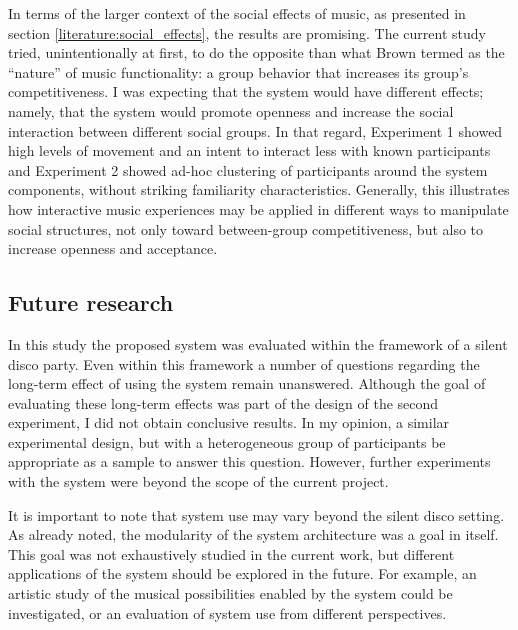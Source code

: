 \documentclass[a4paper,11pt]{article}
\begin{document}
{In terms of the larger context of the social effects of music, as presented in section \ref{literature:social_effects}, the results are promising.
The current study tried, unintentionally at first, to do the opposite than what Brown termed as the ``nature'' of music functionality: a group behavior that increases its group's competitiveness.
I was expecting that the system would have different effects; namely, that the system would promote openness and increase the social interaction between different social groups.
In that regard, Experiment 1 showed high levels of movement and an intent to interact less with known participants and Experiment 2 showed ad-hoc clustering of participants around the system components, without striking familiarity characteristics.
Generally, this illustrates how interactive music experiences may be applied in different ways to manipulate social structures, not only toward between-group competitiveness, but also to increase openness and acceptance.

\subsection{Future research}

In this study the proposed system was evaluated within the framework of a silent disco party.
Even within this framework a number of questions regarding the long-term effect of using the system remain unanswered.
Although the goal of evaluating these long-term effects was part of the design of the second experiment, I did not obtain conclusive results.
In my opinion, a similar experimental design, but with a heterogeneous group of participants be appropriate as a sample to answer this question.
However, further experiments with the system were beyond the scope of the current project.

It is important to note that system use may vary beyond the silent disco setting.
As already noted, the modularity of the system architecture was a goal in itself.
This goal was not exhaustively studied in the current work, but different applications of the system should be explored in the future.
For example, an artistic study of the musical possibilities enabled by the system could be investigated, or an evaluation of system use from different perspectives.

}
\end{document}
